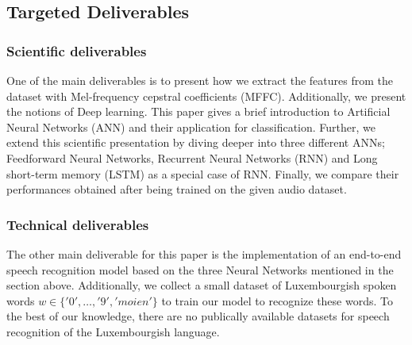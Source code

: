 
\subsection{Targeted Deliverables}

\subsubsection{Scientific deliverables}



One of the main deliverables is to present how we extract the features from the
dataset with Mel-frequency cepstral coefficients (MFFC). Additionally, we
present the notions of Deep learning. This paper gives a brief introduction to
Artificial Neural Networks (ANN) and their application for classification.
Further, we extend this scientific presentation by diving deeper into three
different ANNs; Feedforward Neural Networks, Recurrent Neural Networks (RNN) and
Long short-term memory (LSTM) as a special case of RNN. Finally, we compare
their performances obtained after being trained on the given audio dataset.

\subsubsection{Technical deliverables} 

The other main deliverable for this paper is the implementation of an end-to-end
speech recognition model based on the three Neural Networks mentioned in the
section above.  Additionally, we collect a small dataset of Luxembourgish spoken
words $w \in \{'0',\dots,'9','moien'\}$ to train our model to recognize these
words. To the best of our knowledge, there are no publically available datasets
for speech recognition of the Luxembourgish language.
